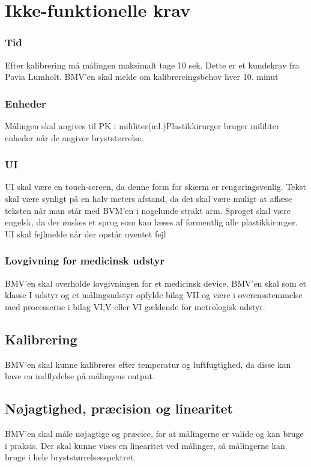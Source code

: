 \documentclass[10pt,a4paper]{report}
\begin{document}
\section*{Ikke-funktionelle krav}
\subsubsection*{Tid}
 Efter kalibrering må målingen maksimalt tage 10 sek. Dette er et kundekrav fra Pavia Lumholt.
 BMV'en skal melde om kalibrereingsbehov hver 10. minut
 \subsubsection*{Enheder}
 Målingen skal angives til PK i mililiter(ml.)Plastikkirurger bruger mililiter enheder når de angiver bryststørrelse. 
 \subsubsection*{UI}
 UI skal være en touch-screen, da denne form for skærm er rengøringsvenlig. 
 Tekst skal være synligt på en halv meters afstand, da det skal være muligt at aflæse teksten når man står med BVM'en i nogelunde strakt arm.
 Sproget skal være engelsk, da der ønskes et sprog som kan læses af formentlig alle plastikkirurger.
 UI skal fejlmelde når der opstår uventet fejl 
 \subsubsection*{Lovgivning for medicinsk udstyr}
 BMV'en skal overholde lovgivningen for et medicinsk device. BMV'en skal som et klasse I udstyr og et målingsudstyr opfylde bilag VII og være i overensstemmelse med processerne i bilag VI,V eller VI gældende for metrologisk udstyr.
 \subsection*{Kalibrering}
 BMV'en skal kunne kalibreres efter temperatur og luftfugtighed, da disse kan have en indflydelse på målingens output. 
 \subsection*{Nøjagtighed, præcision og linearitet}
 BMV'en skal måle nøjagtige og præcice, for at målingerne er valide og kan bruge i praksis. 
 Der skal kunne vises en linearitet ved målinger, så målingerne kan bruge i hele bryststørrelsesspektret. 
     
\end{document}

